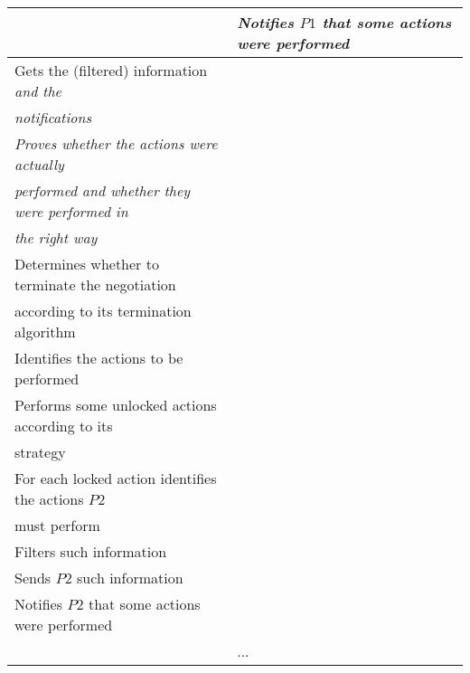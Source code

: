 \documentclass{article}
\begin{document}
\begin{table}
\begin{tabular}{|l|l|}
& \textit{Notifies $P1$ that some actions were performed} \\
\hline
Gets the (filtered) information \textit{and the} & \\
\textit{notifications} & \\
\textit{Proves whether the actions were actually} & \\
\textit{performed and whether they were performed in} & \\
\textit{the right way} & \\
Determines whether to terminate the negotiation & \\
according to its termination algorithm & \\
Identifies the actions to be performed & \\
Performs some unlocked actions according to its & \\
strategy & \\
For each locked action identifies the actions $P2$ & \\
must perform & \\
Filters such information & \\
Sends $P2$ such information & \\
Notifies $P2$ that some actions were performed & \\
\hline
& ... \\
\hline
\end{tabular}
\end{table}
\end{document}
